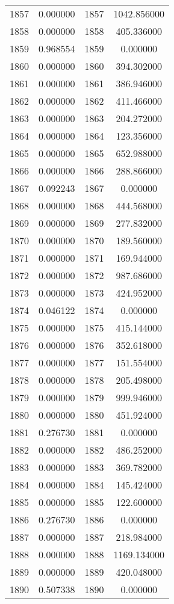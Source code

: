 \documentclass[12pt]{article}
\begin{document}
\begin{longtable}{@{}cccc@{}}
1857 & 0.000000 & 1857 & 1042.856000 \\
1858 & 0.000000 & 1858 & 405.336000 \\
1859 & 0.968554 & 1859 & 0.000000 \\
1860 & 0.000000 & 1860 & 394.302000 \\
1861 & 0.000000 & 1861 & 386.946000 \\
1862 & 0.000000 & 1862 & 411.466000 \\
1863 & 0.000000 & 1863 & 204.272000 \\
1864 & 0.000000 & 1864 & 123.356000 \\
1865 & 0.000000 & 1865 & 652.988000 \\
1866 & 0.000000 & 1866 & 288.866000 \\
1867 & 0.092243 & 1867 & 0.000000 \\
1868 & 0.000000 & 1868 & 444.568000 \\
1869 & 0.000000 & 1869 & 277.832000 \\
1870 & 0.000000 & 1870 & 189.560000 \\
1871 & 0.000000 & 1871 & 169.944000 \\
1872 & 0.000000 & 1872 & 987.686000 \\
1873 & 0.000000 & 1873 & 424.952000 \\
1874 & 0.046122 & 1874 & 0.000000 \\
1875 & 0.000000 & 1875 & 415.144000 \\
1876 & 0.000000 & 1876 & 352.618000 \\
1877 & 0.000000 & 1877 & 151.554000 \\
1878 & 0.000000 & 1878 & 205.498000 \\
1879 & 0.000000 & 1879 & 999.946000 \\
1880 & 0.000000 & 1880 & 451.924000 \\
1881 & 0.276730 & 1881 & 0.000000 \\
1882 & 0.000000 & 1882 & 486.252000 \\
1883 & 0.000000 & 1883 & 369.782000 \\
1884 & 0.000000 & 1884 & 145.424000 \\
1885 & 0.000000 & 1885 & 122.600000 \\
1886 & 0.276730 & 1886 & 0.000000 \\
1887 & 0.000000 & 1887 & 218.984000 \\
1888 & 0.000000 & 1888 & 1169.134000 \\
1889 & 0.000000 & 1889 & 420.048000 \\
1890 & 0.507338 & 1890 & 0.000000 \\

\end{longtable}
\end{document}

